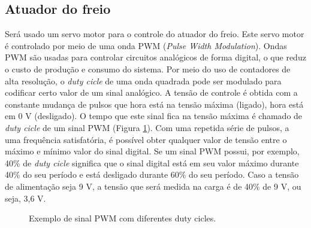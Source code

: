



\subsection{Atuador do freio} %
\label{sub:atuador}

Será usado um servo motor para o controle do atuador do freio. Este servo motor é controlado por meio de uma onda PWM (\textit{Pulse Width Modulation}). Ondas PWM são usadas para controlar circuitos analógicos de forma digital, o que reduz o custo de produção e consumo do sistema. Por meio do uso de contadores de alta resolução, o \textit{duty cicle} de uma onda quadrada pode ser modulado para codificar certo valor de um sinal analógico. A tensão de controle é obtida com a constante mudança de pulsos que hora está na tensão máxima (ligado), hora está em 0 V (desligado). O tempo que este sinal fica na tensão máxima é chamado de \textit{duty cicle} de um sinal PWM (Figura \ref{fig:pwmcircuito}). Com uma repetida série de pulsos, a uma frequência satisfatória, é possível obter qualquer valor de tensão entre o máximo e mínimo valor do sinal digital.
Se um sinal PWM possui, por exemplo, 40\% de \textit{duty cicle} significa que o sinal digital está em seu valor máximo durante 40\% do seu período e está desligado durante 60\% do seu período. Caso a tensão de alimentação seja 9 V, a tensão que será medida na carga é de 40\% de 9 V, ou seja, 3,6 V.
\begin{figure}[h]
  \centering
  \caption{Exemplo de sinal PWM com diferentes duty cicles.}
  \label{fig:pwmcircuito}
\end{figure}


